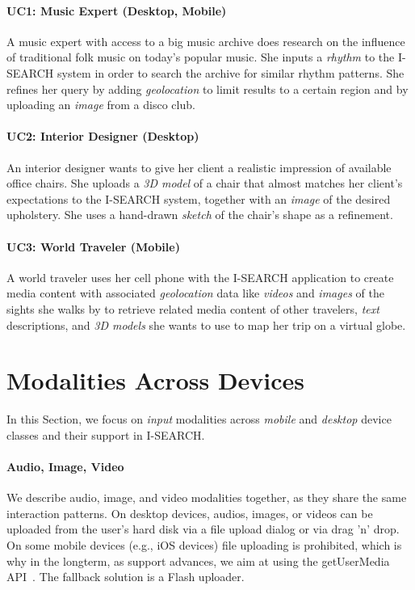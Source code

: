 \documentclass{acm_proc_article-sp}
\let\oldemph\emph
\renewcommand{\emph}[1]{\oldemph{\fontsize{9}{9}\selectfont #1}}
\begin{document}
\paragraph{UC1: Music Expert (Desktop, Mobile)}
A music expert with access to a big music archive does research on the influence of traditional folk music on today's popular music.
She inputs a \emph{rhythm} to the \mbox{I-SEARCH} system in order to search the archive for similar rhythm patterns.
She refines her query by adding \emph{geolocation} to limit results to a certain region and by uploading an \emph{image} from a disco club.
\vspace{-1.5em}

\paragraph{UC2: Interior Designer (Desktop)}
An interior designer wants to give her client a realistic impression of available office chairs.
She uploads a \emph{3D model} of a chair that almost matches her client's expectations to the \mbox{I-SEARCH} system, together with an \emph{image} of the desired upholstery.
She uses a hand-drawn \emph{sketch} of the chair's shape as a refinement.
\vspace{-1.5em}

\paragraph{UC3: World Traveler (Mobile)}
A world traveler uses her cell phone with the \mbox{I-SEARCH} application to create media content with associated \emph{geolocation} data like \emph{videos} and \emph{images} of the sights she walks by to retrieve related media content of other travelers, \emph{text} descriptions, and \emph{3D models} she wants to use to map her trip on a virtual globe.

\section{Modalities Across Devices}
In this Section, we focus on \emph{input} modalities across \emph{mobile} and \emph{desktop} device classes and their support in \mbox{I-SEARCH}.

\paragraph{Audio, Image, Video}
We describe audio, image, and video modalities together, as they share the same interaction patterns.
On desktop devices, audios, images, or videos can be uploaded from the user's hard disk via a file upload dialog or via drag 'n' drop.
On some mobile devices (e.g., iOS devices) file uploading is prohibited, which is why in the longterm, as support advances, we aim at using the getUserMedia API~\cite{getusermedia}.
The fallback solution is a Flash uploader.
\vspace{-1.5em}
\end{document}
